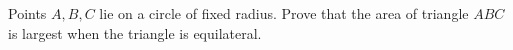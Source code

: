 Points $A,B,C$ lie on a circle of fixed radius. Prove that the area of triangle $ABC$ is largest when the triangle is equilateral.
